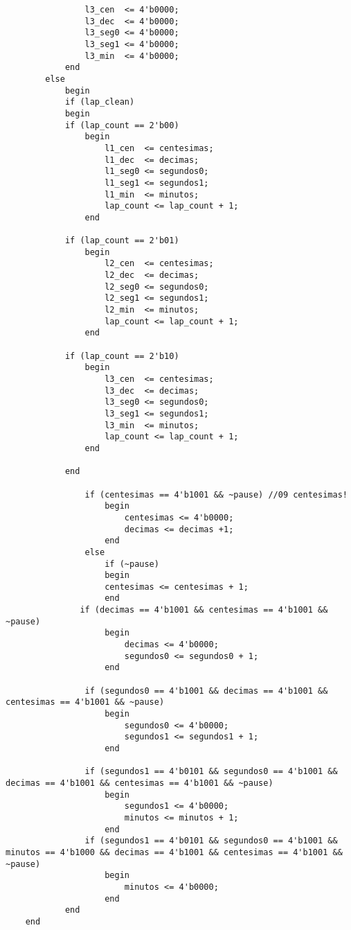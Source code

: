 \documentclass[a4paper,10pt]{article}
\begin{document}
{{\begin{verbatim}
                l3_cen  <= 4'b0000;
                l3_dec  <= 4'b0000;
                l3_seg0 <= 4'b0000;
                l3_seg1 <= 4'b0000;
                l3_min  <= 4'b0000;
            end
        else
            begin
            if (lap_clean)
            begin
            if (lap_count == 2'b00)
                begin
                    l1_cen  <= centesimas;
                    l1_dec  <= decimas;
                    l1_seg0 <= segundos0;
                    l1_seg1 <= segundos1;
                    l1_min  <= minutos;
                    lap_count <= lap_count + 1;
                end
            
            if (lap_count == 2'b01)
                begin
                    l2_cen  <= centesimas;
                    l2_dec  <= decimas;
                    l2_seg0 <= segundos0;
                    l2_seg1 <= segundos1;
                    l2_min  <= minutos;
                    lap_count <= lap_count + 1;
                end
                
            if (lap_count == 2'b10)
                begin
                    l3_cen  <= centesimas;
                    l3_dec  <= decimas;
                    l3_seg0 <= segundos0;
                    l3_seg1 <= segundos1;
                    l3_min  <= minutos;
                    lap_count <= lap_count + 1;
                end
                
            end
            
                if (centesimas == 4'b1001 && ~pause) //09 centesimas!
                    begin
                        centesimas <= 4'b0000;
                        decimas <= decimas +1;
                    end
                else
                    if (~pause)
                    begin
                    centesimas <= centesimas + 1;
                    end
               if (decimas == 4'b1001 && centesimas == 4'b1001 && ~pause)
                    begin
                        decimas <= 4'b0000;
                        segundos0 <= segundos0 + 1;
                    end
                    
                if (segundos0 == 4'b1001 && decimas == 4'b1001 && centesimas == 4'b1001 && ~pause)
                    begin
                        segundos0 <= 4'b0000;
                        segundos1 <= segundos1 + 1;
                    end
                    
                if (segundos1 == 4'b0101 && segundos0 == 4'b1001 && decimas == 4'b1001 && centesimas == 4'b1001 && ~pause)
                    begin
                        segundos1 <= 4'b0000;
                        minutos <= minutos + 1;
                    end
                if (segundos1 == 4'b0101 && segundos0 == 4'b1001 && minutos == 4'b1000 && decimas == 4'b1001 && centesimas == 4'b1001 && ~pause)
                    begin
                        minutos <= 4'b0000;
                    end
            end
    end
    


\end{verbatim}}}
\end{document}
